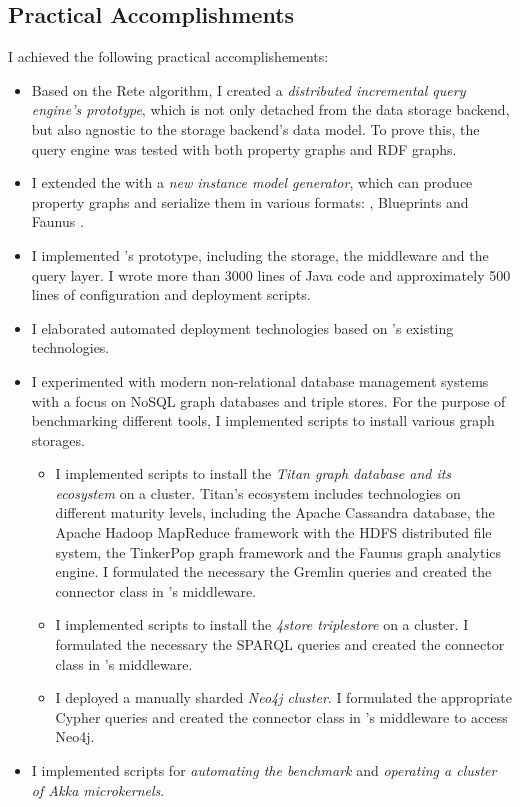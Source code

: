 \subsection{Practical Accomplishments}

I achieved the following practical accomplishements:

\begin{itemize}
  \item Based on the Rete algorithm, I created a \emph{distributed incremental query engine's prototype}, which is not only detached from the data storage backend, but also agnostic to the storage backend's data model. To prove this, the query engine was tested with both property graphs and RDF graphs.
  \item I extended the \tb{} with a \emph{new instance model generator}, which can produce property graphs and serialize them in various formats: \graphml{}, Blueprints \graphson{} and Faunus \graphson{}. %
  \item I implemented \iqd{}'s prototype, including the storage, the middleware and the query layer. I wrote more than 3000 lines of Java code and approximately 500 lines of configuration and deployment scripts.
  \item I elaborated automated deployment technologies based on \eiq{}'s existing technologies.
  \item I experimented with modern non-relational database management systems with a focus on NoSQL graph databases and triple stores. For the purpose of benchmarking different tools, I implemented scripts to install various graph storages. 
  \begin{itemize}
    \item I implemented scripts to install the \emph{Titan graph database and its ecosystem} on a cluster. Titan's ecosystem includes technologies on different maturity levels, including the Apache Cassandra database, the Apache Hadoop MapReduce framework with the HDFS distributed file system, the TinkerPop graph framework and the Faunus graph analytics engine. I formulated the necessary the Gremlin queries and created the connector class in \iqd{}'s middleware.
    \item I implemented scripts to install the \emph{4store triplestore} on a cluster. I formulated the necessary the SPARQL queries and created the connector class in \iqd{}'s middleware. 
    \item I deployed a manually sharded \emph{Neo4j cluster}. I formulated the appropriate Cypher queries and created the connector class in \iqd{}'s middleware to access Neo4j.
  \end{itemize}
  \item I implemented scripts for \emph{automating the benchmark} and \emph{operating a cluster of Akka microkernels}.
\end{itemize}

